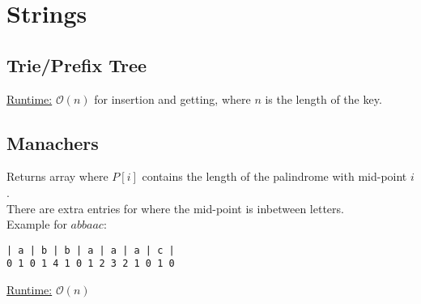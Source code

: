 \section{Strings}
\subsection{Trie/Prefix Tree}
\underline{Runtime:} $\mathcal{O}(n)$ for insertion and getting, where
$n$ is the length of the key.
\subsection{Manachers}
Returns array where $P[i]$ contains the length of the palindrome with mid-point $i$.\\
There are extra entries for where the mid-point is inbetween letters.\\
Example for $abbaac$:
\begin{lstlisting}
| a | b | b | a | a | a | c |
0 1 0 1 4 1 0 1 2 3 2 1 0 1 0
\end{lstlisting}
\underline{Runtime:} $\mathcal{O}(n)$



